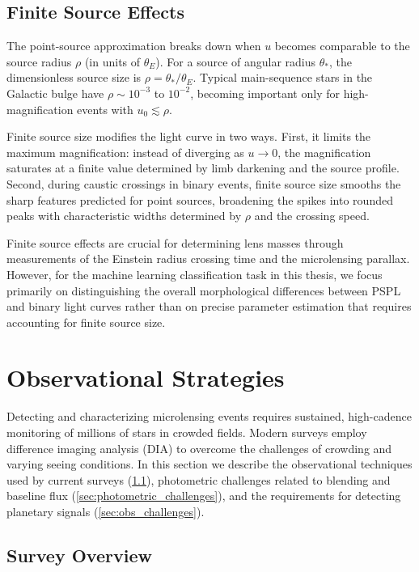 \subsection{Finite Source Effects}
\label{sec:finite_source}

The point-source approximation breaks down when $u$ becomes comparable to the source radius $\rho$ (in units of $\theta_E$). For a source of angular radius $\theta_*$, the dimensionless source size is $\rho = \theta_*/\theta_E$. Typical main-sequence stars in the Galactic bulge have $\rho \sim 10^{-3}$ to $10^{-2}$, becoming important only for high-magnification events with $u_0 \lesssim \rho$.

Finite source size modifies the light curve in two ways. First, it limits the maximum magnification: instead of diverging as $u \to 0$, the magnification saturates at a finite value determined by limb darkening and the source profile. Second, during caustic crossings in binary events, finite source size smooths the sharp features predicted for point sources, broadening the spikes into rounded peaks with characteristic widths determined by $\rho$ and the crossing speed.

Finite source effects are crucial for determining lens masses through measurements of the Einstein radius crossing time and the microlensing parallax. However, for the machine learning classification task in this thesis, we focus primarily on distinguishing the overall morphological differences between PSPL and binary light curves rather than on precise parameter estimation that requires accounting for finite source size.

\section{Observational Strategies}
\label{sec:observations}

Detecting and characterizing microlensing events requires sustained, high-cadence monitoring of millions of stars in crowded fields. Modern surveys employ difference imaging analysis (DIA) to overcome the challenges of crowding and varying seeing conditions. In this section we describe the observational techniques used by current surveys (\cref{sec:surveys}), photometric challenges related to blending and baseline flux (\cref{sec:photometric_challenges}), and the requirements for detecting planetary signals (\cref{sec:obs_challenges}).

\subsection{Survey Overview}
\label{sec:surveys}


